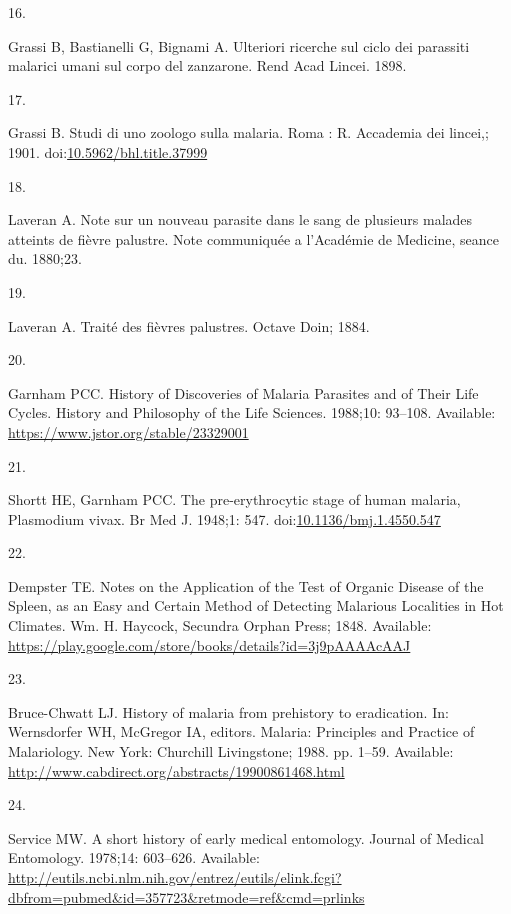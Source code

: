 \documentclass[
]{book}
\newlength{\cslhangindent}
\newlength{\csllabelwidth}
\newenvironment{CSLReferences}[2] %
 {\begin{list}{}{%
  \setlength{\itemindent}{0pt}
  \setlength{\leftmargin}{0pt}
  \setlength{\parsep}{0pt}
  \ifodd #1
   \setlength{\leftmargin}{\cslhangindent}
   \setlength{\itemindent}{-1\cslhangindent}
  \fi
  \setlength{\itemsep}{#2\baselineskip}}}
 {\end{list}}
\newcommand{\CSLLeftMargin}[1]{\parbox[t]{\csllabelwidth}{\strut#1\strut}}
\newcommand{\CSLRightInline}[1]{\parbox[t]{\linewidth - \csllabelwidth}{\strut#1\strut}}
\begin{document}
\begin{CSLReferences}{0}{1}
\CSLLeftMargin{16. }%
\CSLRightInline{Grassi B, Bastianelli G, Bignami A. Ulteriori ricerche sul ciclo dei parassiti malarici umani sul corpo del zanzarone. Rend Acad Lincei. 1898. }

\CSLLeftMargin{17. }%
\CSLRightInline{Grassi B. Studi di uno zoologo sulla malaria. {Roma :} {R. Accademia dei lincei,}; 1901. doi:\href{https://doi.org/10.5962/bhl.title.37999}{10.5962/bhl.title.37999}}

\CSLLeftMargin{18. }%
\CSLRightInline{Laveran A. Note sur un nouveau parasite dans le sang de plusieurs malades atteints de fièvre palustre. Note communiquée a l'Académie de Medicine, seance du. 1880;23. }

\CSLLeftMargin{19. }%
\CSLRightInline{Laveran A. Traité des fièvres palustres. {Octave Doin}; 1884. }

\CSLLeftMargin{20. }%
\CSLRightInline{Garnham PCC. History of {Discoveries} of {Malaria Parasites} and of {Their Life Cycles}. History and Philosophy of the Life Sciences. 1988;10: 93--108. Available: \url{https://www.jstor.org/stable/23329001}}

\CSLLeftMargin{21. }%
\CSLRightInline{Shortt HE, Garnham PCC. The pre-erythrocytic stage of human malaria, {Plasmodium} vivax. Br Med J. 1948;1: 547. doi:\href{https://doi.org/10.1136/bmj.1.4550.547}{10.1136/bmj.1.4550.547}}

\CSLLeftMargin{22. }%
\CSLRightInline{Dempster TE. Notes on the {Application} of the {Test} of {Organic Disease} of the {Spleen}, as an {Easy} and {Certain Method} of {Detecting Malarious Localities} in {Hot Climates}. {Wm. H. Haycock, Secundra Orphan Press}; 1848. Available: \url{https://play.google.com/store/books/details?id=3j9pAAAAcAAJ}}

\CSLLeftMargin{23. }%
\CSLRightInline{Bruce-Chwatt LJ. History of malaria from prehistory to eradication. In: Wernsdorfer WH, McGregor IA, editors. Malaria: {Principles} and {Practice} of {Malariology}. {New York}: {Churchill Livingstone}; 1988. pp. 1--59. Available: \url{http://www.cabdirect.org/abstracts/19900861468.html}}

\CSLLeftMargin{24. }%
\CSLRightInline{Service MW. A short history of early medical entomology. Journal of Medical Entomology. 1978;14: 603--626. Available: \url{http://eutils.ncbi.nlm.nih.gov/entrez/eutils/elink.fcgi?dbfrom=pubmed&id=357723&retmode=ref&cmd=prlinks}}


\end{CSLReferences}
\end{document}

